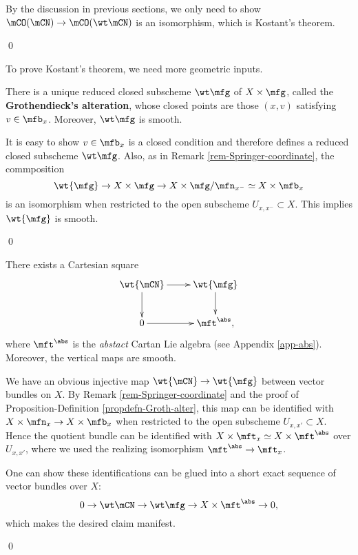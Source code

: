 	\proof
		By the discussion in previous sections, we only need to show $\mCO(\mCN) \to \mCO(\wt\mCN)$ is an isomorphism, which is Kostant's theorem.

	\qed

	To prove Kostant's theorem, we need more geometric inputs.

	\begin{propdefn}
		\label{propdefn-Groth-alter}
		There is a unique reduced closed subscheme $\wt\mfg$ of $X\mt \mfg$, called the \textbf{Grothendieck's alteration}, whose closed points are those $(x,v)$ satisfying $v\in \mfb_x$. Moreover, $\wt\mfg$ is smooth.
	\end{propdefn}

	\proof[Sketch]
		It is easy to show $v\in \mfb_x$ is a closed condition and therefore defines a reduced closed subscheme $\wt\mfg$. Also, as in Remark \ref{rem-Springer-coordinate}, the commposition 
		\[
			\wt{\mfg} \to X\mt \mfg \to X \mt \mfg/\mfn_{x^-} \simeq X \mt \mfb_x
		\] 
		is an isomorphism when restricted to the open subscheme $U_{x,x^-}\subset X$. This implies $\wt{\mfg}$ is smooth.

	\qed



	\begin{lem}
		\label{lem-Groth-alter-Cartan}
		There exists a Cartesian square
		\[
			\xymatrix{
				\wt{\mCN} \ar[r] \ar[d] & \wt{\mfg} \ar[d] \\
				0 \ar[r] & \mft^\abs,
			}
		\]
		where $\mft^\abs$ is the \emph{abstact} Cartan Lie algebra (see Appendix \ref{app-abs}). Moreover, the vertical maps are smooth.

	\end{lem}

	\proof[Sketch]
		We have an obvious injective map $\wt{\mCN} \to \wt{\mfg}$ between vector bundles on $X$. By Remark \ref{rem-Springer-coordinate} and the proof of Proposition-Definition \ref{propdefn-Groth-alter}, this map can be identified with $X\mt \mfn_x \to X\mt \mfb_x $ when restricted to the open subscheme $U_{x,x'} \subset X$. Hence the quotient bundle can be identified with $X \mt \mft_x \simeq X\mt \mft^\abs$ over $U_{x,x'}$, where we used the realizing isomorphism $\mft^\abs \to \mft_x$.

		One can show these identifications can be glued into a short exact sequence of vector bundles over $X$:
		\[
			0 \to \wt\mCN \to \wt\mfg \to X \mt \mft^\abs \to 0,
		\]
		which makes the desired claim manifest.

	\qed

